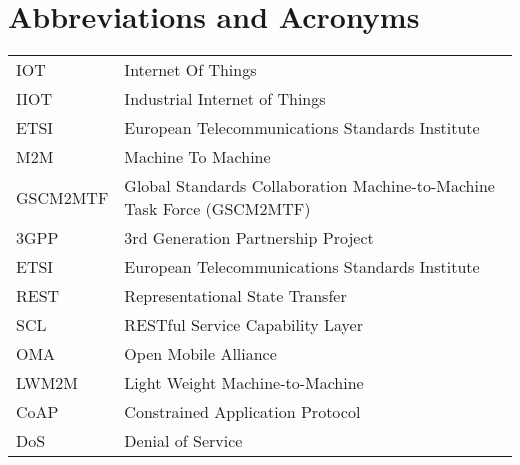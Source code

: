 \chapter*{Abbreviations and Acronyms}


\noindent
\begin{longtable}{@{}p{}p{}@{}}
IOT & Internet Of Things \\
IIOT & Industrial Internet of Things \\
ETSI & European Telecommunications Standards Institute \\
M2M & Machine To Machine \\
GSCM2MTF & Global Standards Collaboration Machine-to-Machine Task Force (GSCM2MTF) \\
3GPP & 3rd Generation Partnership Project \\ 
ETSI & European Telecommunications Standards Institute \\
REST & Representational State Transfer \\
SCL & RESTful Service Capability Layer \\
OMA & Open Mobile Alliance \\
LWM2M & Light Weight Machine-to-Machine \\
CoAP & Constrained Application Protocol \\
DoS & Denial of Service \\

\end{longtable}
